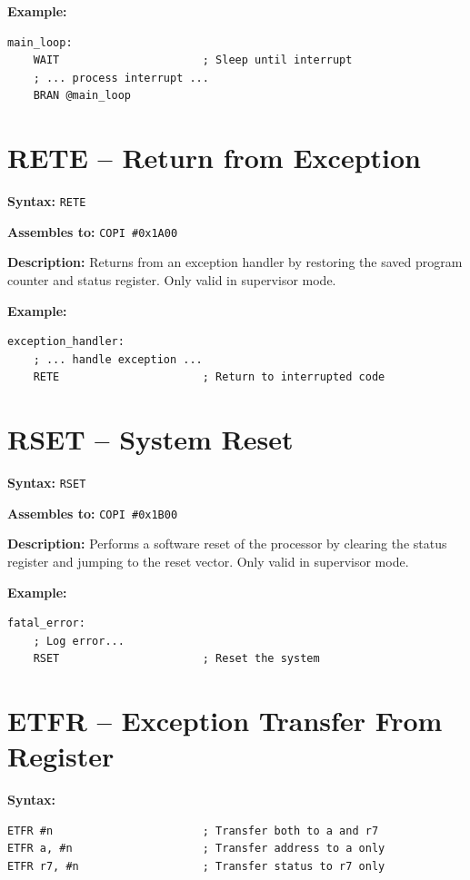 \textbf{Example:}
\begin{lstlisting}
main_loop:
    WAIT                      ; Sleep until interrupt
    ; ... process interrupt ...
    BRAN @main_loop
\end{lstlisting}

\section{RETE -- Return from Exception}

\textbf{Syntax:} \texttt{RETE}

\textbf{Assembles to:} \texttt{COPI \#0x1A00}

\textbf{Description:} Returns from an exception handler by restoring the saved program counter and status register. Only valid in supervisor mode.

\textbf{Example:}
\begin{lstlisting}
exception_handler:
    ; ... handle exception ...
    RETE                      ; Return to interrupted code
\end{lstlisting}

\section{RSET -- System Reset}

\textbf{Syntax:} \texttt{RSET}

\textbf{Assembles to:} \texttt{COPI \#0x1B00}

\textbf{Description:} Performs a software reset of the processor by clearing the status register and jumping to the reset vector. Only valid in supervisor mode.

\textbf{Example:}
\begin{lstlisting}
fatal_error:
    ; Log error...
    RSET                      ; Reset the system
\end{lstlisting}

\section{ETFR -- Exception Transfer From Register}

\textbf{Syntax:}
\begin{lstlisting}
ETFR #n                       ; Transfer both to a and r7
ETFR a, #n                    ; Transfer address to a only
ETFR r7, #n                   ; Transfer status to r7 only
\end{lstlisting}

